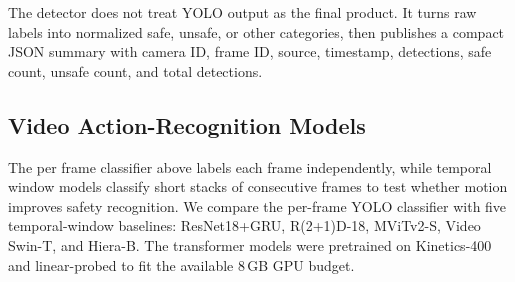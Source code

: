 \documentclass[conference]{IEEEtran}
\begin{document}
The detector does not treat YOLO output as the final product. It turns raw labels into normalized safe, unsafe, or other categories, then publishes a compact JSON summary with camera ID, frame ID, source, timestamp, detections, safe count, unsafe count, and total detections.

\subsection{Video Action-Recognition Models}
\label{subsec:action-models}

The per frame classifier above labels each frame independently, while temporal
window models classify short stacks of consecutive frames to test whether motion
improves safety recognition. We compare the per-frame YOLO classifier with five
temporal-window baselines: ResNet18+GRU, R(2+1)D-18, MViTv2-S, Video Swin-T, and
Hiera-B. The transformer models were pretrained on Kinetics-400 and linear-probed
to fit the available 8\,GB GPU budget.




\end{document}
